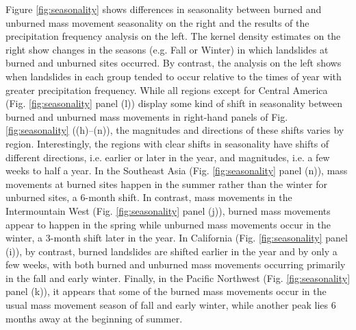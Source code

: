 \documentclass[nhess, manuscript]{copernicus}
\begin{document}
Figure \ref{fig:seasonality} shows differences in seasonality
between burned and unburned mass movement seasonality on the right and the
results of the precipitation frequency analysis on the left. The kernel density estimates on the right show changes in the seasons (e.g. Fall or Winter) in which landslides at burned and unburned sites occurred. By contrast, the analysis on the left shows when landslides in each group tended to occur relative to the times of year with greater precipitation frequency. While all
regions except for Central America (Fig. \ref{fig:seasonality}
panel (l)) display some kind of shift in seasonality between burned and
unburned mass movements in right-hand panels of Fig. \ref{fig:seasonality} ((h)--(n)), the magnitudes
and directions of these shifts varies by region. Interestingly, the
regions with clear shifts in seasonality have shifts of different
directions, i.e. earlier or later in the year, and magnitudes, i.e. a few
weeks to half a year. In the Southeast Asia
(Fig. \ref{fig:seasonality} panel (n)), mass movements at burned
sites happen in the summer rather than the winter for unburned sites, a
6-month shift. In contrast, mass movements in the Intermountain West
(Fig. \ref{fig:seasonality} panel (j)), burned mass movements appear
to happen in the spring while unburned mass movements occur in the winter, a
3-month shift later in the year. In California
(Fig. \ref{fig:seasonality} panel (i)), by contrast, burned
landslides are shifted earlier in the year and by only a few weeks, with
both burned and unburned mass movements occurring primarily in the fall and
early winter. Finally, in the Pacific Northwest
(Fig. \ref{fig:seasonality} panel (k)), it appears that some of
the burned mass movements occur in the usual mass movement season of fall and
early winter, while another peak lies 6 months away at the beginning of
summer.
\end{document}
